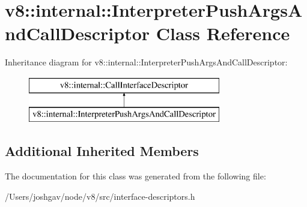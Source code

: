 \hypertarget{classv8_1_1internal_1_1_interpreter_push_args_and_call_descriptor}{}\section{v8\+:\+:internal\+:\+:Interpreter\+Push\+Args\+And\+Call\+Descriptor Class Reference}
\label{classv8_1_1internal_1_1_interpreter_push_args_and_call_descriptor}
Inheritance diagram for v8\+:\+:internal\+:\+:Interpreter\+Push\+Args\+And\+Call\+Descriptor\+:\begin{figure}[H]
\begin{center}
\leavevmode
\includegraphics[height=2.000000cm]{classv8_1_1internal_1_1_interpreter_push_args_and_call_descriptor}
\end{center}
\end{figure}
\subsection*{Additional Inherited Members}


The documentation for this class was generated from the following file\+:\begin{DoxyCompactItemize}
\item 
/\+Users/joshgav/node/v8/src/interface-\/descriptors.\+h\end{DoxyCompactItemize}

